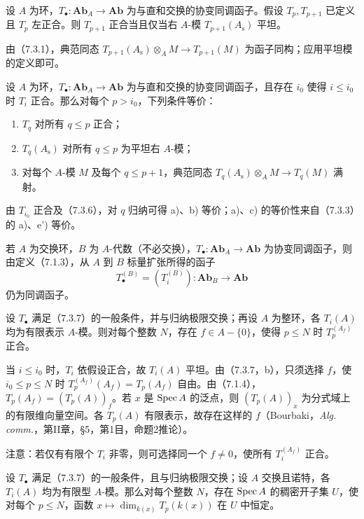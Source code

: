 设 $A$ 为环，$T_\bullet:\mathbf{Ab}_A\to\mathbf{Ab}$ 为与直和交换的协变同调函子。假设 $T_p,T_{p+1}$ 已定义且 $T_p$ 左正合。则 $T_{p+1}$ 正合当且仅当右 $A$-模 $T_{p+1}(A_{\mathrm s})$ 平坦。

由（7.3.1），典范同态 $T_{p+1}(A_{\mathrm s})\otimes_A M\to T_{p+1}(M)$ 为函子同构；应用平坦模的定义即可。

设 $A$ 为环，$T_\bullet:\mathbf{Ab}_A\to\mathbf{Ab}$ 为与直和交换的协变同调函子，且存在 $i_0$ 使得 $i\leq i_0$ 时 $T_i$ 正合。那么对每个 $p>i_0$，下列条件等价：
\begin{enumerate}[label=\alph*)]
\item $T_q$ 对所有 $q\leq p$ 正合；
\item $T_q(A_{\mathrm s})$ 对所有 $q\leq p$ 为平坦右 $A$-模；
\item 对每个 $A$-模 $M$ 及每个 $q\leq p+1$，典范同态 $T_q(A_{\mathrm s})\otimes_A M\to T_q(M)$ 满射。
\end{enumerate}
由 $T_{i_0}$ 正合及（7.3.6），对 $q$ 归纳可得 a)、b) 等价；a)、c) 的等价性来自（7.3.3）的 a)、e') 等价。

若 $A$ 为交换环，$B$ 为 $A$-代数（不必交换），$T_\bullet:\mathbf{Ab}_A\to\mathbf{Ab}$ 为协变同调函子，则由定义（7.1.3），从 $A$ 到 $B$ 标量扩张所得的函子
\[
 T_\bullet^{(B)}=(T_i^{(B)}):\mathbf{Ab}_B\longrightarrow\mathbf{Ab}
\]
仍为同调函子。

设 $T_\bullet$ 满足（7.3.7）的一般条件，并与归纳极限交换；再设 $A$ 为整环，各 $T_i(A)$ 均为有限表示 $A$-模。则对每个整数 $N$，存在 $f\in A-\{0\}$，使得 $p\leq N$ 时 $T_p^{(A_f)}$ 正合。

当 $i\leq i_0$ 时，$T_i$ 依假设正合，故 $T_i(A)$ 平坦。由（7.3.7，b），只须选择 $f$，使 $i_0\leq p\leq N$ 时 $T_p^{(A_f)}(A_f)=T_p(A_f)$ 自由。由（7.1.4），$T_p(A_f)=(T_p(A))_f$。若 $x$ 是 $\operatorname{Spec} A$ 的泛点，则 $(T_p(A))_x$ 为分式域上的有限维向量空间。各 $T_p(A)$ 有限表示，故存在这样的 $f$（Bourbaki，\textit{Alg. comm.}，第II章，§5，第1目，命题2推论）。

注意：若仅有有限个 $T_i$ 非零，则可选择同一个 $f\ne0$，使所有 $T_i^{(A_f)}$ 正合。

设 $T_\bullet$ 满足（7.3.7）的一般条件，且与归纳极限交换；设 $A$ 交换且诺特，各 $T_i(A)$ 均为有限型 $A$-模。那么对每个整数 $N$，存在 $\operatorname{Spec} A$ 的稠密开子集 $U$，使对每个 $p\leq N$，函数 $x\mapsto\dim_{k(x)}T_p(k(x))$ 在 $U$ 中恒定。

